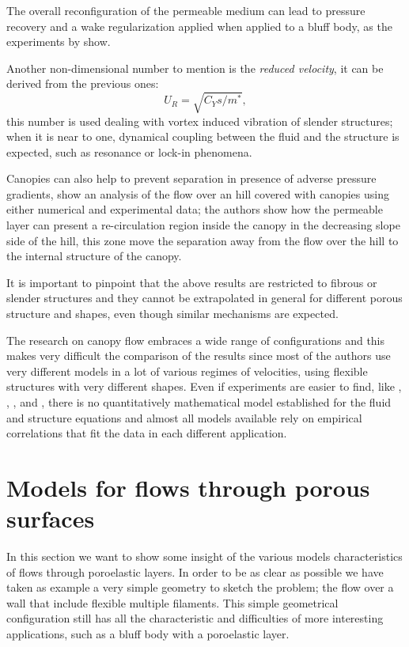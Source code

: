 The overall reconfiguration of the permeable medium can lead to pressure recovery and a wake regularization applied when applied to a bluff body, as the experiments by \citet{gosselin2011drag} show.

Another non-dimensional number to mention is the \textit{reduced velocity}, it can be derived from the previous ones:
$$ U_R = \sqrt{C_Y s / m^*},$$
this number is used dealing with vortex induced vibration of slender structures; when it is near to one, dynamical coupling between the fluid and the structure is expected, such as resonance or lock-in phenomena.

Canopies can also help to prevent separation in presence of adverse pressure gradients, \citet{belcher2012wind} show an analysis of the flow over an hill covered with canopies using either numerical and experimental data; the authors show how the permeable layer can present a re-circulation region inside the canopy in the decreasing slope side of the hill, this zone move the separation away from the flow over the hill to the internal structure of the canopy.

It is important to pinpoint that the above results are restricted to fibrous or slender structures and they cannot be extrapolated in general for different porous structure and shapes, even though similar mechanisms are expected.

The research on canopy flow embraces a wide range of configurations and this makes very difficult the comparison of the results since most of the authors use very different models in a lot of various regimes of velocities, using flexible structures with very different shapes.
Even if experiments are easier to find, like \citet{segalini2011experimental}, \citet{segalini2013scaling}, \citet{maza2013coupled}, \citet{barsu2016drag} and \citet{alvarado2017nature}, there is no quantitatively mathematical model established for the fluid and structure equations and almost all models available rely on empirical correlations that fit the data in each different application.


\section{Models for flows through porous surfaces}

In this section we want to show some insight of the various models characteristics of flows through poroelastic layers.
In order to be as clear as possible we have taken as example a very simple geometry to sketch the problem; the flow over a wall that include flexible multiple filaments. 
This simple geometrical configuration still has all the characteristic and difficulties of more interesting applications, such as a bluff body with a poroelastic layer.

